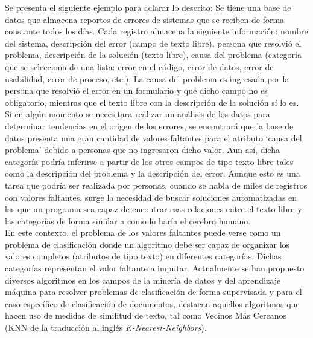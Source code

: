 Se presenta el siguiente ejemplo para aclarar lo descrito: Se tiene una base de datos que almacena reportes de errores de sistemas que se reciben de forma constante todos los días. Cada registro almacena la siguiente información: nombre del sistema, descripción del error (campo de texto libre), persona que resolvió el problema, descripción de la solución (texto libre), causa del problema (categoría que se selecciona de una lista: error en el código, error de datos, error de usabilidad, error de proceso, etc.). La causa del problema es ingresada por la persona que resolvió el error en un formulario y que dicho campo no es obligatorio, mientras que el texto libre con la descripción de la solución sí lo es. \\
Si en algún momento se necesitara realizar un análisis de los datos para determinar tendencias en el origen de los errores, se encontrará que la base de datos presenta una gran cantidad de valores faltantes para el atributo ‘causa del problema’ debido a personas que no ingresaron dicho valor. Aun así, dicha categoría podría inferirse a partir de los otros campos de tipo texto libre tales como la descripción del problema y la descripción del error. Aunque esto es una tarea que podría ser realizada por personas, cuando se habla de miles de registros con valores faltantes, surge la necesidad de buscar soluciones automatizadas en las que un programa sea capaz de encontrar esas relaciones entre el texto libre y las categorías de forma similar a como lo haría el cerebro humano.\\
En este contexto, el problema de los valores faltantes puede verse como un problema de clasificación donde un algoritmo debe ser capaz de organizar los valores completos (atributos de tipo texto) en diferentes categorías. Dichas categorías representan el valor faltante a imputar. Actualmente se han propuesto diversos algoritmos en los campos de la minería de datos y del aprendizaje máquina para resolver problemas de clasificación de forma supervisada \cite{tran2015multiple,truong2004learning, ishioka2014investigations} y para el caso específico de clasificación de documentos, destacan aquellos algoritmos que hacen uso de medidas de similitud de texto, tal como Vecinos Más Cercanos (KNN de la traducción al inglés \textit{K-Nearest-Neighbors})\cite{terzi2014text}.\\

